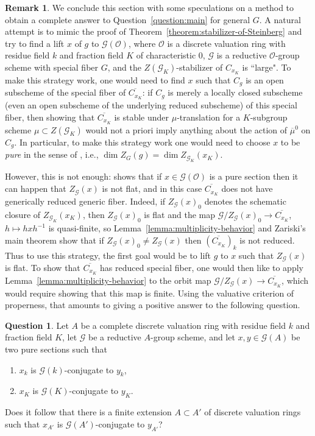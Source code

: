 \documentclass[11pt,reqno]{amsart}
\theoremstyle{definition}
\newtheorem{remark}[theorem]{Remark}
\newtheorem{question}[theorem]{Question}
\newcommand{\cG}{\mathcal{G}}
\newcommand{\cO}{\mathcal{O}}
\newcommand{\ov}[1]{\overline{#1}}
\begin{document}
\begin{remark}\label{remark:non-regular}
	We conclude this section with some speculations on a method to obtain a complete answer to Question~\ref{question:main} for general $G$. A natural attempt is to mimic the proof of Theorem~\ref{theorem:stabilizer-of-Steinberg} and try to find a lift $x$ of $g$ to $\cG(\cO)$, where $\cO$ is a discrete valuation ring with residue field $k$ and fraction field $K$ of characteristic $0$, $\cG$ is a reductive $\cO$-group scheme with special fiber $G$, and the $Z(\cG_K)$-stabilizer of $C_{x_K}$ is ``large". To make this strategy work, one would need to find $x$ such that $C_g$ is an open subscheme of the special fiber of $\overline{C_{x_K}}$: if $C_g$ is merely a locally closed subscheme (even an open subscheme of the underlying reduced subscheme) of this special fiber, then showing that $\overline{C_{x_K}}$ is stable under $\mu$-translation for a $K$-subgroup scheme $\mu \subset Z(\cG_K)$ would not a priori imply anything about the action of $\overline{\mu}^0$ on $C_g$. In particular, to make this strategy work one would need to choose $x$ to be \textit{pure} in the sense of \cite[Definition 3.8]{Cotner-flat}, i.e., $\dim Z_G(g) = \dim Z_{\cG_K}(x_K)$.
	
	However, this is not enough: \cite[Remark 5.5]{Cotner-flat} shows that if $x \in \cG(\cO)$ is a pure section then it can happen that $Z_{\cG}(x)$ is not flat, and in this case $\overline{C_{x_K}}$ does not have generically reduced generic fiber. Indeed, if $Z_{\cG}(x)_0$ denotes the schematic closure of $Z_{\cG_K}(x_K)$, then $Z_{\cG}(x)_0$ is flat and the map $\cG/Z_{\cG}(x)_0 \to \overline{C_{x_K}}$, $h \mapsto hxh^{-1}$ is quasi-finite, so Lemma~\ref{lemma:multiplicity-behavior} and Zariski's main theorem show that if $Z_{\cG}(x)_0 \neq Z_{\cG}(x)$ then $(\ov{C_{x_K}})_k$ is not reduced. Thus to use this strategy, the first goal would be to lift $g$ to $x$ such that $Z_{\cG}(x)$ is flat. To show that $\overline{C_{x_K}}$ has reduced special fiber, one would then like to apply Lemma~\ref{lemma:multiplicity-behavior} to the orbit map $\cG/Z_{\cG}(x) \to \overline{C_{x_K}}$, which would require showing that this map is finite. Using the valuative criterion of properness, that amounts to giving a positive answer to the following question.
\end{remark}

\begin{question}\label{question:finiteness}
	Let $A$ be a complete discrete valuation ring with residue field $k$ and fraction field $K$, let $\cG$ be a reductive $A$-group scheme, and let $x, y \in \cG(A)$ be two pure sections such that
	\begin{enumerate}
		\item $x_k$ is $\cG(k)$-conjugate to $y_k$,
		\item $x_K$ is $\cG(K)$-conjugate to $y_K$.
	\end{enumerate}
	Does it follow that there is a finite extension $A \subset A'$ of discrete valuation rings such that $x_{A'}$ is $\cG(A')$-conjugate to $y_{A'}$?
\end{question}
\end{document}
